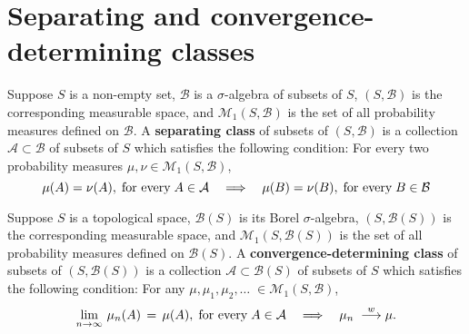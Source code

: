 

\section{Separating and convergence-determining classes}
\setcounter{theorem}{0}
\setcounter{equation}{0}

\renewcommand{\theenumi}{\roman{enumi}}
\renewcommand{\labelenumi}{\textnormal{(\theenumi)}$\;\;$}

\begin{definition}
\mbox{}\vskip 0.1cm
\noindent
Suppose $S$ is a non-empty set, $\mathcal{B}$ is a $\sigma$-algebra of subsets of $S$,
$(S,\mathcal{B})$ is the corresponding measurable space, and
$\mathcal{M}_{1}\!\left(S,\mathcal{B}\right)$ is the set of all probability measures defined
on $\mathcal{B}$.
A \textbf{separating class} of subsets of $\left(S,\mathcal{B}\right)$ is
a collection $\mathcal{A} \subset \mathcal{B}$ of subsets of $S$
which satisfies the following condition:
For every two probability measures $\mu, \nu \in \mathcal{M}_{1}\!\left(S,\mathcal{B}\right)$,
\begin{equation*}
\mu(A) = \nu(A), \;\textnormal{for every}\; A \in \mathcal{A}
\quad\Longrightarrow\quad
\mu(B) = \nu(B), \;\textnormal{for every}\; B \in \mathcal{B}		
\end{equation*}
\end{definition}

\begin{definition}
\mbox{}\vskip 0.1cm
\noindent
Suppose $S$ is a topological space, $\mathcal{B}(S)$ is its Borel $\sigma$-algebra,
$(S,\mathcal{B}(S))$ is the corresponding measurable space, and
$\mathcal{M}_{1}\!\left(S,\mathcal{B}(S)\right)$ is the set of all probability measures defined
on $\mathcal{B}(S)$.
A \textbf{convergence-determining class} of subsets of $\left(S,\mathcal{B}(S)\right)$ is
a collection $\mathcal{A} \subset \mathcal{B}(S)$ of subsets of $S$
which satisfies the following condition:
For any $\mu, \mu_{1}, \mu_{2}, \ldots\; \in \mathcal{M}_{1}\!\left(S,\mathcal{B}\right)$,
\begin{equation*}
\lim_{n\rightarrow\infty}\,\mu_{n}(A) \, = \, \mu(A), \;\textnormal{for every}\; A \in \mathcal{A}
\quad\Longrightarrow\quad
\mu_{n} \; \overset{w}{\longrightarrow} \mu.
\end{equation*} 
\end{definition}

